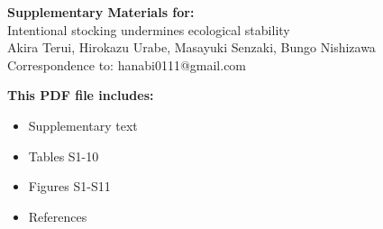 \begin{center}
\LARGE{\textbf{Supplementary Materials for:}}\\[7.5mm]
\LARGE{Intentional stocking undermines ecological stability}\\[7.5mm]
\large{Akira Terui, Hirokazu Urabe, Masayuki Senzaki, Bungo Nishizawa}\\[7.5mm]
\large{Correspondence to: hanabi0111@gmail.com}\\[15mm]
\end{center}
\begin{flushleft}
\textbf{This PDF file includes:}
\begin{itemize}
\item Supplementary text
\item Tables S1-10
\item Figures S1-S11
\item References
\end{itemize}
\end{flushleft}

\newpage